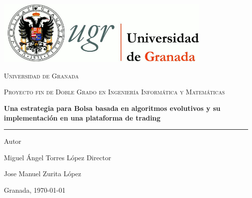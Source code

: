 
	\begin{titlepage}
		\afterpage{\blankpage}
		\centering
		\includegraphics[width=0.8\textwidth]{imagenes/logo_ugr.jpg}\par\vspace{1cm}
		{\scshape\LARGE Universidad de Granada \par}
		\vspace{1cm}
		{\scshape\Large Proyecto fin de Doble Grado en Ingenier\'ia Inform\'atica y Matem\'aticas\par}
		\vspace{1.5cm}
		{\huge\bfseries Una estrategia para Bolsa basada en algoritmos evolutivos y su implementaci\'on en una plataforma de trading\par}
		\vspace{0.2cm}
		\noindent\rule{\textwidth}{1pt}
		\vspace{2cm}

		\vfill
		Autor\par
		{\large Miguel \'Angel Torres L\'opez}
		\vfill
		Director\par
		{\large Jose Manuel Zurita L\'opez}
		
		\vfill
		
		{\large Granada, \today\par}
			
	\end{titlepage}
		